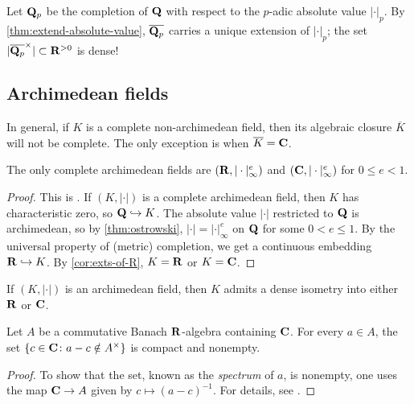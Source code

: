 \begin{example}
Let $\mathbf{Q}_p$ be the completion of $\mathbf{Q}$ with respect to the $p$-adic absolute 
value $|\cdot|_p$. By \autoref{thm:extend-absolute-value}, 
$\overline{\mathbf{Q}_p}$ carries a unique extension of $|\cdot|_p$; the set 
$|\overline{\mathbf{Q}_p}^\times|\subset \mathbf{R}^{>0}$ is dense!
\end{example}


\subsection{Archimedean fields}

In general, if $K$ is a complete non-archimedean field, then its algebraic 
closure $\overline K$ will not be complete. The only exception is when 
$\overline K=\mathbf{C}$.

\begin{theorem}\label{thm:Gelfand-Mazur}
The only complete archimedean fields are $(\mathbf{R},|\cdot|_\infty^e)$ and 
$(\mathbf{C},|\cdot|_\infty^e)$ for $0\leqslant e<1$. 
\end{theorem}
\begin{proof}
This is \cite[1.2.4]{engler-prestel}. If $(K,|\cdot|)$ is a complete 
archimedean field, then $K$ has characteristic zero, so $\mathbf{Q}\hookrightarrow K$. 
The absolute value $|\cdot|$ restricted to $\mathbf{Q}$ is archimedean, so by 
\autoref{thm:ostrowski}, $|\cdot|=|\cdot|_\infty^e$ on $\mathbf{Q}$ for some 
$0<e\leqslant 1$. By the universal property of (metric) completion, we get a 
continuous embedding $\mathbf{R}\hookrightarrow K$. By \autoref{cor:exts-of-R}, 
$K=\mathbf{R}$ or $K=\mathbf{C}$. 
\end{proof}

\begin{corollary}
If $(K,|\cdot|)$ is an archimedean field, then $K$ admits a dense isometry 
into either $\mathbf{R}$ or $\mathbf{C}$. 
\end{corollary}

\begin{lemma}\label{lemma:spec-Banach}
Let $A$ be a commutative Banach $\mathbf{R}$-algebra containing $\mathbf{C}$. For every 
$a\in A$, the set $\{c\in \mathbf{C}\colon a-c\notin A^\times\}$ is compact and 
nonempty. 
\end{lemma}
\begin{proof}
To show that the set, known as the \emph{spectrum} of $a$, is nonempty, 
one uses the map $\mathbf{C}\to A$ given by $c\mapsto (a-c)^{-1}$. For details, see 
\cite[18.6]{rudin-1987}. 
\end{proof}

